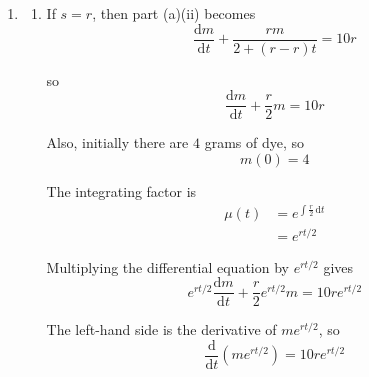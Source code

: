 \documentclass[leqno]{article}
\begin{document}
\begin{enumerate}[
  label=\textbf{\arabic*.},
  leftmargin=*,
  topsep=0pt,
  partopsep=0pt,
  parsep=0pt
]
\begin{djsSolution}
\begin{enumerate}[label=\textbf{(\alph*)}]
\begin{enumerate}[label=(\roman*)]
    In the same time, liquid leaves at $s$ litres per minute, so volume removed is $st$ litres.

    Hence the volume in the tank after $t$ minutes is
    \[
    2+rt-st=2+(r-s)t
    \]

    Since the mass of dye is $m$ grams, the concentration is
    \[
    \frac{m}{2+(r-s)t}
    \]

    So the concentration of dye after $t$ minutes is $\frac{m}{2+(r-s)t}$ grams per litre.

    \item The rate at which dye enters the tank is
    \[
    10 \times r = 10r
    \]

    grams per minute.

    From part (i), the concentration in the tank is $\frac{m}{2+(r-s)t}$ grams per litre, so the rate at which dye leaves is
    \[
    s\times\frac{m}{2+(r-s)t}
    \]

    grams per minute.

    Therefore
    \[
    \frac{\mathrm{d}m}{\mathrm{d}t}=\text{rate in}-\text{rate out}
    \]

    so
    \[
    \frac{\mathrm{d}m}{\mathrm{d}t}=10r-\frac{sm}{2+(r-s)t}
    \]

    Rearranging gives
    \[
    \frac{\mathrm{d}m}{\mathrm{d}t}+\frac{sm}{2+(r-s)t}=10r
    \]
  \end{enumerate}

  \item
  \begin{enumerate}[label=(\roman*)]
    \item If $s=r$, then part (a)(ii) becomes
    \[
    \frac{\mathrm{d}m}{\mathrm{d}t}+\frac{rm}{2+(r-r)t}=10r
    \]

    so
    \[
    \frac{\mathrm{d}m}{\mathrm{d}t}+\frac{r}{2}m=10r
    \]

    Also, initially there are $4$ grams of dye, so
    \[
    m(0)=4
    \]

    The integrating factor is
    \begin{align*}
    \mu(t)&=e^{\int \frac{r}{2}\,\mathrm{d}t}\\
    &=e^{rt/2}
    \end{align*}

    Multiplying the differential equation by $e^{rt/2}$ gives
    \[
    e^{rt/2}\frac{\mathrm{d}m}{\mathrm{d}t}+\frac{r}{2}e^{rt/2}m=10r e^{rt/2}
    \]

    The left-hand side is the derivative of $me^{rt/2}$, so
    \[
    \frac{\mathrm{d}}{\mathrm{d}t}\left(me^{rt/2}\right)=10r e^{rt/2}
    \]


\end{enumerate}
\end{enumerate}
\end{djsSolution}
\end{enumerate}
\end{document}
